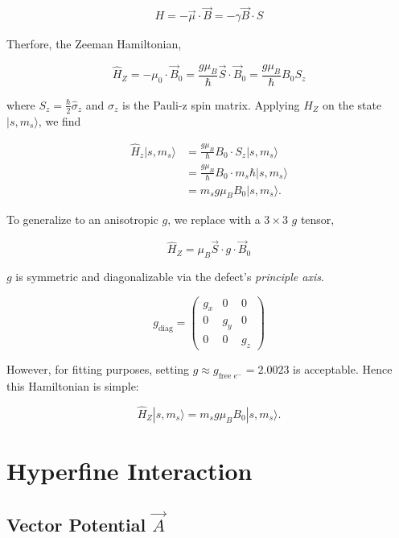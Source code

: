 \documentclass[svgnames]{article}
\begin{document}
\begin{align} \label{torque}
H = -\vec{\mu} \cdot \vec{B} = -\gamma \vec{B} \cdot S 
\end{align} 

Therfore, the Zeeman Hamiltonian, 

\[
\hat{H}_Z = -\mu_0 \cdot \vec{B}_0 = \frac{g\mu_B}{\hbar} \vec{S} \cdot
\vec{B}_0 = \frac{g\mu_B}{\hbar}B_0 S_z \] 

where $S_z = \frac{\hbar}{2}\hat{\sigma}_z$ and $\sigma_z$ is the Pauli-z spin matrix. Applying $\hat{H}_Z$ on the state $|s,
m_s\rangle$, we find 

\begin{align*}
    \hat{H}_z |s, m_s\rangle &= \frac{g\mu_B}{\hbar}B_0 \cdot S_z|s, m_s\rangle
                          \\ &= \frac{g\mu_B}{\hbar}B_0 \cdot m_s\hbar |s, m_s\rangle
                          \\ &= m_s g\mu_B B_0 |s, m_s\rangle.   
\end{align*} \vspace{3px} 

To generalize to an anisotropic $g$, we replace with a $3\times 3$ $g$ tensor, 

\[
\hat{H}_Z = \mu_B \vec{S} \cdot g \cdot \vec{B}_0
\] 

$g$ is symmetric and diagonalizable via the defect's \textit{principle axis}. 

\[
    g_{\text{diag}} = \begin{pmatrix}
        g_x & 0 & 0 \\ 
        0 & g_y & 0 \\ 
        0 & 0 & g_z 
    \end{pmatrix}  
\] 

However, for fitting purposes, setting $g\approx g_{\text{free } e^-}=2.0023$ is
acceptable. Hence this Hamiltonian is simple: 

\vspace{5px}
\begin{greenbox}
    \[
      \hat{H}_Z |s, m_s\rangle = m_s g\mu_B B_0 |s, m_s\rangle.
  \]
\end{greenbox}


\section{Hyperfine Interaction}

\subsection{Vector Potential $\vec{A}$}
\end{document}

